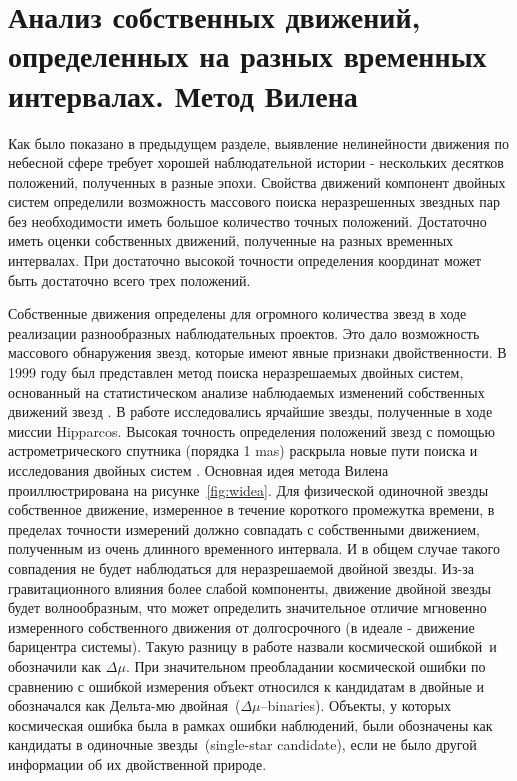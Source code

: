 \section{Анализ собственных движений, определенных на разных временных интервалах. Метод Вилена} \label{sec:ch1/sec2}
Как было показано в предыдущем разделе, выявление нелинейности движения по небесной сфере требует хорошей наблюдательной истории - нескольких десятков положений, полученных в разные эпохи. Свойства движений компонент двойных систем определили возможность массового поиска неразрешенных звездных пар без необходимости иметь большое количество точных положений. Достаточно иметь оценки собственных движений, полученные на разных временных интервалах. При достаточно высокой точности определения координат может быть достаточно всего трех положений.

 Собственные движения определены для огромного количества звезд в ходе реализации разнообразных наблюдательных проектов. Это дало возможность массового обнаружения звезд, которые имеют явные признаки двойственности. В 1999 году был представлен метод поиска неразрешаемых двойных систем, основанный на статистическом анализе наблюдаемых изменений собственных движений звезд . В работе исследовались ярчайшие звезды, полученные в ходе миссии Hipparcos. Высокая точность определения положений звезд с помощью  астрометрического спутника (порядка 1 mas) раскрыла новые пути поиска и исследования двойных систем . Основная идея метода Вилена проиллюстрирована на рисунке~\ref{fig:widea}. Для физической одиночной звезды собственное движение, измеренное в течение короткого промежутка времени, в пределах точности измерений должно совпадать с собственными движением, полученным из очень длинного временного интервала. И в общем случае такого совпадения не будет наблюдаться для неразрешаемой двойной звезды. Из-за гравитационного влияния более слабой компоненты, движение двойной звезды будет волнообразным, что может определить значительное отличие мгновенно измеренного собственного движения от долгосрочного (в идеале - движение барицентра системы). Такую разницу в работе назвали \glqq космической ошибкой\grqq\ и обозначили как $\Delta\mu$. При значительном преобладании космической ошибки по сравнению с ошибкой измерения объект относился к кандидатам в двойные и обозначался как \glqq Дельта-мю двойная\grqq\ (\glqq $\Delta\mu$--binaries\grqq ). Объекты, у которых космическая ошибка была в рамках ошибки наблюдений, были обозначены как \glqq кандидаты в одиночные звезды\grqq\  (\glqq single-star candidate\grqq ), если не было другой информации об их двойственной природе.


